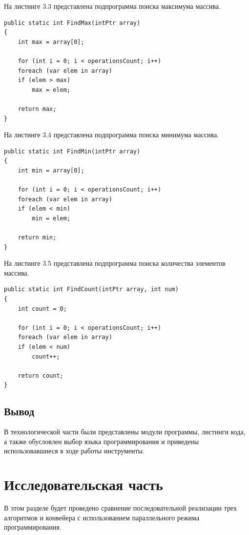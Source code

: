 \documentclass[12pt]{report}
\begin{document}
На листинге 3.3 представлена подпрограмма поиска максимума массива.

\begin{lstlisting}[label=some-code,caption=Подпрограмма поиска максимума массива]
public static int FindMax(intPtr array)
{
	int max = array[0];

	for (int i = 0; i < operationsCount; i++)
	foreach (var elem in array)
	if (elem > max)
		max = elem;

	return max;
}
\end{lstlisting}

На листинге 3.4 представлена подпрограмма поиска минимума массива.

\begin{lstlisting}[label=some-code,caption=Подпрограмма поиска минимума массива]
public static int FindMin(intPtr array)
{
	int min = array[0];

	for (int i = 0; i < operationsCount; i++)
	foreach (var elem in array)
	if (elem < min)
		min = elem;

	return min;
}
\end{lstlisting}

На листинге 3.5 представлена подпрограмма поиска количества элементов массива.

\begin{lstlisting}[label=some-code,caption= Подпрограмма поиска количества элементов массива]
public static int FindCount(intPtr array, int num)
{
	int count = 0;

	for (int i = 0; i < operationsCount; i++)
	foreach (var elem in array)
	if (elem < num)
		count++;

	return count;
} 
\end{lstlisting}


\section{Вывод}
В технологической части были представлены модули программы, листинги кода, а также обусловлен выбор языка программирования и приведены использовавшиеся в ходе работы инструменты.

\chapter{Исследовательская часть}

В этом разделе будет проведено сравнение последовательной реализации трех алгоритмов и конвейера с использованием параллельного режима программирования.
\end{document}
